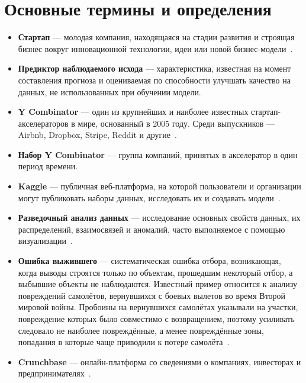 \section{Основные термины и определения}
\begin{itemize}
    \item \textbf{Стартап} --- молодая компания, находящаяся на стадии развития и строящая бизнес вокруг инновационной технологии, идеи или новой бизнес-модели~\cite{vtbstartup}.
    \item \textbf{Предиктор наблюдаемого исхода} --- характеристика, известная на момент составления прогноза и оцениваемая по способности улучшать качество на данных, не использованных при обучении модели.
    \item \textbf{Y Combinator} --- один из крупнейших и наиболее известных стартап-акселераторов в мире, основанный в 2005 году. Среди выпускников --- Airbnb, Dropbox, Stripe, Reddit и другие~\cite{ycombinator}.
    \item \textbf{Набор Y Combinator} --- группа компаний, принятых в акселератор в один период времени.
    \item \textbf{Kaggle} --- публичная веб-платформа, на которой пользователи и организации могут публиковать наборы данных, исследовать их и создавать модели~\cite{wikikaggle}.
    \item \textbf{Разведочный анализ данных} --- исследование основных свойств данных, их распределений, взаимосвязей и аномалий, часто выполняемое с помощью визуализации~\cite{wikiEDA}.
    \item \textbf{Ошибка выжившего} --- систематическая ошибка отбора, возникающая, когда выводы строятся только по объектам, прошедшим некоторый отбор, а выбывшие объекты не наблюдаются. Известный пример относится к анализу повреждений самолётов, вернувшихся с боевых вылетов во время Второй мировой войны. Пробоины на вернувшихся самолётах указывали на участки, повреждение которых было совместимо с возвращением, поэтому усиливать следовало не наиболее повреждённые, а менее повреждённые зоны, попадания в которые чаще приводили к потере самолёта~\cite{wald-aircraft}.
    \item \textbf{Crunchbase} --- онлайн-платформа со сведениями о компаниях, инвесторах и предпринимателях~\cite{getinvestor}.
\end{itemize}
